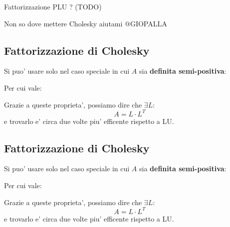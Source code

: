 Fattorizzazione PLU ? (TODO)

Non so dove mettere Cholesky aiutami @GIOPALLA
\subsection{Fattorizzazione di Cholesky}
Si puo' usare solo nel caso speciale in cui $ A $ sia \textbf{definita semi-positiva}:

Per cui vale:

Grazie a queste proprieta', possiamo dire che $ \exists L: $
\[
A = L \cdot L^T
\]
e trovarlo e' circa due volte piu' efficente rispetto a LU.



\subsection{Fattorizzazione di Cholesky}
Si puo' usare solo nel caso speciale in cui $ A $ sia \textbf{definita semi-positiva}:

Per cui vale:

Grazie a queste proprieta', possiamo dire che $ \exists L: $
\[
A = L \cdot L^T
\]
e trovarlo e' circa due volte piu' efficente rispetto a LU.




